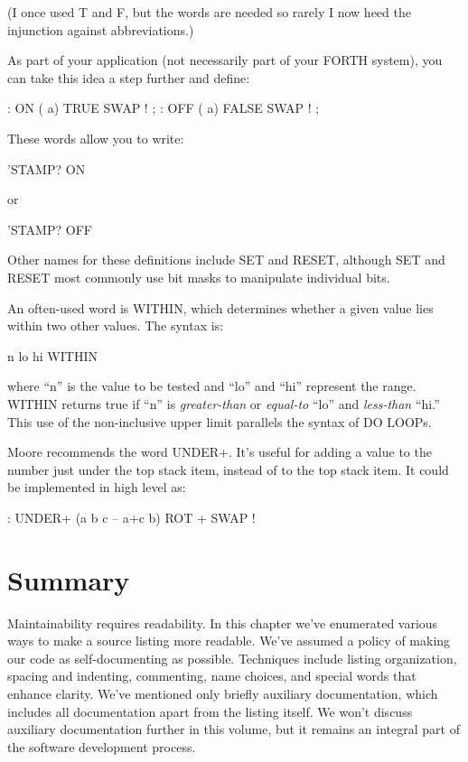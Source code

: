 (I once used T and F, but the words are needed so rarely I now heed
the injunction against abbreviations.)

As part of your application (not necessarily part of your FORTH
system), you can take this idea a step further and define:
\begin{Code}
: ON   ( a) TRUE SWAP ! ;
: OFF   ( a) FALSE SWAP ! ;
\end{Code}
These words allow you to write:
\begin{Code}
'STAMP? ON
\end{Code}
or
\begin{Code}
'STAMP? OFF
\end{Code}
Other names for these definitions include SET and RESET, although
SET and RESET most commonly use bit masks to manipulate individual
bits.

An often-used word is WITHIN, which determines whether a given
value lies within two other values.  The syntax is:
\begin{Code}
n  lo hi WITHIN
\end{Code}
where ``n'' is the value to be tested and ``lo'' and ``hi'' represent the range.
WITHIN returns true if ``n'' is \emph{greater-than} or \emph{equal-to} ``lo'' and
\emph{less-than} ``hi.'' This use of the non-inclusive upper limit parallels the syntax
of DO LOOPs.

Moore recommends the word UNDER+.  It's useful for adding a
value to the number just under the top stack item, instead of to the top
stack item.  It could be implemented in high level as:
\begin{Code}
: UNDER+ (a b c -- a+c b) ROT + SWAP !
\end{Code}

\section{Summary}
Maintainability requires readability.  In this chapter we've enumerated
various ways to make a source listing more readable.  We've assumed a
policy of making our code as self-documenting as possible.  Techniques include
listing organization, spacing and indenting, commenting, name
choices, and special words that enhance clarity.
We've mentioned only briefly auxiliary documentation, which includes
all documentation apart from the listing itself.  We won't discuss
auxiliary documentation further in this volume, but it remains an integral
part of the software development process.

